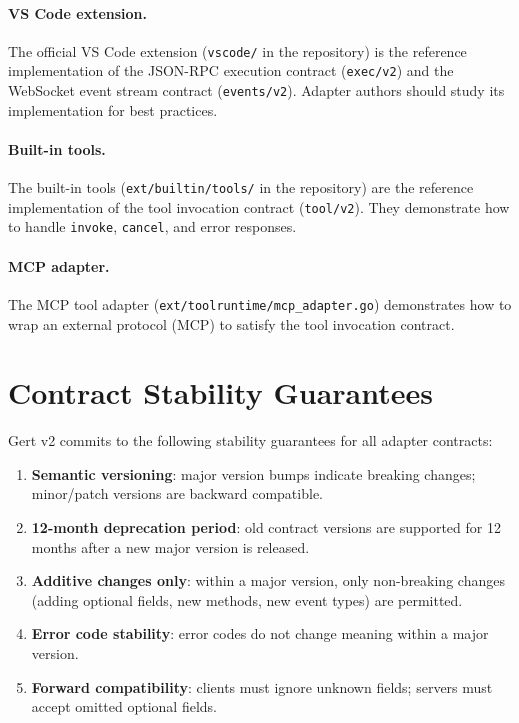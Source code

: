 \paragraph{VS Code extension.}

The official VS Code extension (\texttt{vscode/} in the repository) is the
reference implementation of the JSON-RPC execution contract (\texttt{exec/v2})
and the WebSocket event stream contract (\texttt{events/v2}).  Adapter authors
should study its implementation for best practices.

\paragraph{Built-in tools.}

The built-in tools (\texttt{ext/builtin/tools/} in the repository) are the
reference implementation of the tool invocation contract (\texttt{tool/v2}).
They demonstrate how to handle \texttt{invoke}, \texttt{cancel}, and error
responses.

\paragraph{MCP adapter.}

The MCP tool adapter (\texttt{ext/toolruntime/mcp\_adapter.go}) demonstrates
how to wrap an external protocol (MCP) to satisfy the tool invocation contract.

\section{Contract Stability Guarantees}

Gert v2 commits to the following stability guarantees for all adapter
contracts:

\begin{enumerate}
  \item \textbf{Semantic versioning}: major version bumps indicate breaking
        changes; minor/patch versions are backward compatible.
  \item \textbf{12-month deprecation period}: old contract versions are
        supported for 12 months after a new major version is released.
  \item \textbf{Additive changes only}: within a major version, only
        non-breaking changes (adding optional fields, new methods, new event
        types) are permitted.
  \item \textbf{Error code stability}: error codes do not change meaning within
        a major version.
  \item \textbf{Forward compatibility}: clients must ignore unknown fields;
        servers must accept omitted optional fields.
\end{enumerate}

